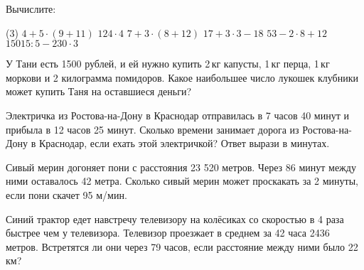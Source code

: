 \begin{class}[number=7]
	\begin{listofex}
		\item Вычислите:
		\begin{tasks}(3)
			\task \( 4 + 5 \cdot (9 + 11) \)
			\task \( 124\cdot4 \)
			\task \( 7 + 3 \cdot (8 + 12) \)
			\task \( 17 + 3 \cdot 3 - 18 \)
			\task \( 53 - 2\cdot 8 + 12 \)
			\task \( 15015 : 5 - 230 \cdot 3 \)
		\end{tasks}
		\item У Тани есть 1500 рублей, и ей нужно купить 2 кг капусты, 1 кг перца, 1 кг моркови и 2 килограмма помидоров. Какое наибольшее число лукошек клубники может купить Таня на оставшиеся деньги?
		\begin{figure}[h]
		\end{figure}
		
		\item Электричка из Ростова-на-Дону в Краснодар отправилась в 7 часов 40 минут и прибыла в 12 часов 25 минут. Сколько времени занимает дорога из Ростова-на-Дону в Краснодар, если ехать этой электричкой? Ответ вырази в минутах.
		\item Сивый мерин догоняет пони с расстояния 23 520 метров. Через 86 минут между ними оставалось 42 метра. Сколько сивый мерин может проскакать за 2 минуты, если пони скачет 95 м/мин.
		\item Синий трактор едет навстречу телевизору на колёсиках со скоростью в 4 раза быстрее чем у телевизора. Телевизор проезжает в среднем за 42 часа 2436 метров. Встретятся ли они через 79  часов, если расстояние между ними было 22 км?
		
	\end{listofex}
\end{class}

